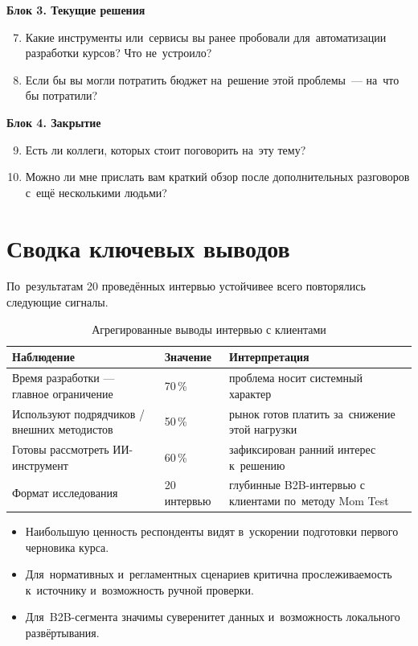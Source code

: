 \textbf{Блок 3. Текущие решения}
\begin{enumerate}
  \setcounter{enumi}{6}
  \item Какие инструменты или~сервисы вы ранее пробовали для~автоматизации
    разработки курсов? Что не~устроило?
  \item Если бы вы могли потратить бюджет на~решение этой проблемы~—
    на~что бы потратили?
\end{enumerate}

\textbf{Блок 4. Закрытие}
\begin{enumerate}
  \setcounter{enumi}{8}
  \item Есть ли коллеги, которых стоит поговорить на~эту тему?
  \item Можно ли мне прислать вам краткий обзор после дополнительных
    разговоров с~ещё несколькими людьми?
\end{enumerate}

\section*{Сводка ключевых выводов}

По~результатам 20 проведённых интервью устойчивее всего повторялись
следующие сигналы.

\begin{table}[H]
  \caption{Агрегированные выводы интервью с клиентами}
  \label{tab:custdev}
  \centering
  \begin{tabular}{|P{5cm}|P{2.5cm}|P{5.5cm}|}
  \hline
  \textbf{Наблюдение} & \textbf{Значение} & \textbf{Интерпретация} \\
  \hline
  Время разработки — главное ограничение
    & 70\,\%
    & проблема носит системный характер \\
  \hline
  Используют подрядчиков / внешних методистов
    & 50\,\%
    & рынок готов платить за~снижение этой нагрузки \\
  \hline
  Готовы рассмотреть ИИ-инструмент
    & 60\,\%
    & зафиксирован ранний интерес к~решению \\
  \hline
  Формат исследования
    & 20 интервью
    & глубинные B2B-интервью с клиентами по~методу Mom Test \\
  \hline
  \end{tabular}
\end{table}

\begin{itemize}
  \item Наибольшую ценность респонденты видят в~ускорении подготовки
    первого черновика курса.
  \item Для~нормативных и~регламентных сценариев критична прослеживаемость
    к~источнику и~возможность ручной проверки.
  \item Для~B2B-сегмента значимы суверенитет данных и~возможность
    локального развёртывания.
\end{itemize}
